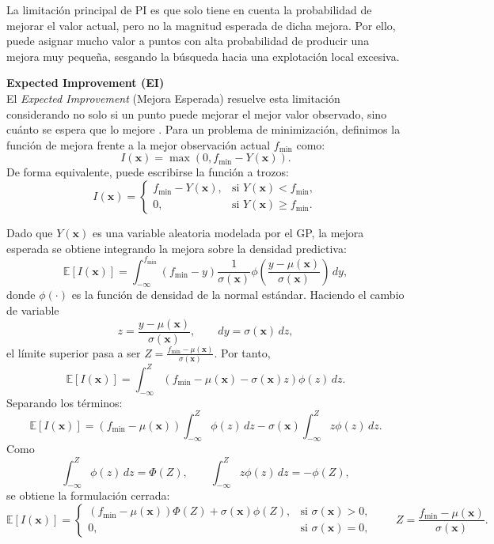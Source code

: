 La limitación principal de PI es que solo tiene en cuenta la probabilidad de mejorar el valor
actual, pero no la magnitud esperada de dicha mejora. Por ello, puede asignar mucho valor a
puntos con alta probabilidad de producir una mejora muy pequeña, sesgando la búsqueda
hacia una explotación local excesiva.

\vspace{0.3cm}
\noindent\textbf{Expected Improvement (EI)} \\

El \textit{Expected Improvement} (Mejora Esperada) resuelve esta limitación considerando
no solo si un punto puede mejorar el mejor valor observado, sino cuánto se espera que lo
mejore \cite{jones1998efficient}. Para un problema de minimización, definimos la función
de mejora frente a la mejor observación actual \(f_{\min}\) como:
\[
I(\bm{x})
=
\max(0, f_{\min}-Y(\bm{x})).
\]
De forma equivalente, puede escribirse la función a trozos:
\[
I(\bm{x})
=
\begin{cases}
f_{\min}-Y(\bm{x}), & \text{si } Y(\bm{x})<f_{\min},\\
0, & \text{si } Y(\bm{x})\geq f_{\min}.
\end{cases}
\]

Dado que \(Y(\bm{x})\) es una variable aleatoria modelada por el GP, la mejora esperada se
obtiene integrando la mejora sobre la densidad predictiva:
\[
\mathbb{E}[I(\bm{x})]
=
\int_{-\infty}^{f_{\min}}
(f_{\min}-y)
\frac{1}{\sigma(\bm{x})}
\phi\left(
\frac{y-\mu(\bm{x})}{\sigma(\bm{x})}
\right)
\,dy,
\]
donde \(\phi(\cdot)\) es la función de densidad de la normal estándar. Haciendo el cambio
de variable
\[
z=\frac{y-\mu(\bm{x})}{\sigma(\bm{x})},
\qquad
dy=\sigma(\bm{x})\,dz,
\]
el límite superior pasa a ser
\(
Z=\frac{f_{\min}-\mu(\bm{x})}{\sigma(\bm{x})}.
\)
Por tanto,
\[
\mathbb{E}[I(\bm{x})]
=
\int_{-\infty}^{Z}
\left(f_{\min}-\mu(\bm{x})-\sigma(\bm{x})z\right)\phi(z)\,dz.
\]
Separando los términos:
\[
\mathbb{E}[I(\bm{x})]
=
(f_{\min}-\mu(\bm{x}))\int_{-\infty}^{Z}\phi(z)\,dz
-
\sigma(\bm{x})\int_{-\infty}^{Z}z\phi(z)\,dz.
\]
Como
\[
\int_{-\infty}^{Z}\phi(z)\,dz=\Phi(Z),
\qquad
\int_{-\infty}^{Z}z\phi(z)\,dz=-\phi(Z),
\]
se obtiene la formulación cerrada:
\begin{equation}
\label{eq:ei}
\mathbb{E}[I(\bm{x})] =
\begin{cases} 
(f_{\min} - \mu(\bm{x})) \Phi(Z) + \sigma(\bm{x}) \phi(Z),
& \text{si } \sigma(\bm{x}) > 0, \\[0.2em]
0,
& \text{si } \sigma(\bm{x}) = 0,
\end{cases}
\qquad
Z = \frac{f_{\min} - \mu(\bm{x})}{\sigma(\bm{x})}.
\end{equation}

